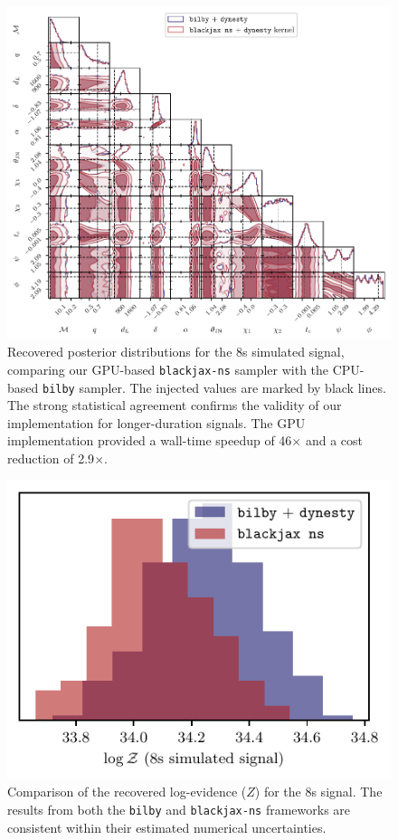 \documentclass[fleqn,usenatbib]{mnras}
\begin{document}
\begin{figure}
    \centering
    \includegraphics{figures/8s_corner_comparison.pdf}
    \caption{Recovered posterior distributions for the 8s simulated
    signal, comparing our GPU-based \texttt{blackjax-ns} sampler
    with the CPU-based \texttt{bilby} sampler. The injected values
    are marked by black lines. The strong statistical agreement confirms
    the validity of our implementation for longer-duration signals.
    The GPU implementation provided a wall-time speedup of 46$\times$ and a cost reduction of 2.9$\times$.}
    \label{fig:8s_posteriors}
\end{figure}

\begin{figure}
    \centering
    \includegraphics{figures/8s_logZ_comparison.pdf}
    \caption{Comparison of the recovered log-evidence ($Z$) for the 8s
    signal. The results from both the \texttt{bilby} and
    \texttt{blackjax-ns} frameworks are consistent within their
    estimated numerical uncertainties.}
    \label{fig:8s_logZ}
\end{figure}
\end{document}
